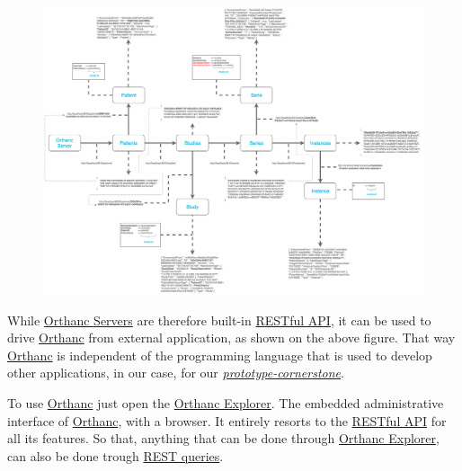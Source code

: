 \documentclass{tufte-book} %
\begin{document}
\begin{figure}[!hbt]
\begin{center}
\includegraphics[width=\textwidth]{graphics/orthanc_example.png}
\end{center}
\end{figure}

\hfill


While \href{https://www.orthanc-server.com/}{Orthanc Servers} are therefore built-in \href{https://en.wikipedia.org/wiki/Representational_state_transfer}{RESTful API}, it can be used to drive \href{https://www.orthanc-server.com/}{Orthanc} from external application, as shown on the above figure. That way \href{https://www.orthanc-server.com/}{Orthanc} is independent of the programming language that is used to develop other applications, in our case, for our \href{https://github.com/MIMBCD-UI/prototype-cornerstone}{\textit{prototype-cornerstone}}.

To use \href{https://www.orthanc-server.com/}{Orthanc} just open the \href{http://book.orthanc-server.com/users/cookbook.html}{Orthanc Explorer}. The embedded administrative interface of \href{https://www.orthanc-server.com/}{Orthanc}, with a browser. It entirely resorts to the \href{https://en.wikipedia.org/wiki/Representational_state_transfer}{RESTful API} for all its features. So that, anything that can be done through \href{http://book.orthanc-server.com/users/cookbook.html}{Orthanc Explorer}, can also be done trough \href{http://book.orthanc-server.com/users/rest.html}{REST queries}.
\end{document}
